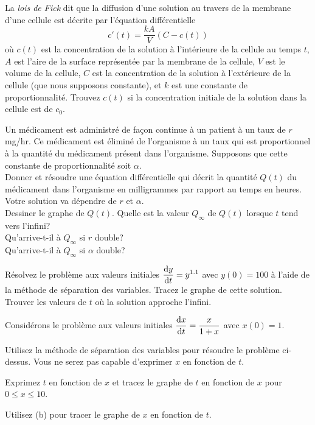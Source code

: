 \begin{question}[\life]
La {\em lois de Fick} dit que la diffusion d'une solution au travers de la
membrane d'une cellule est décrite par l'équation différentielle
\[
c'(t) = \frac{kA}{V} \left( C - c(t) \right)
\]
où $c(t)$ est la concentration de la solution à l'intérieure de la cellule au
temps $t$, $A$ est l'aire de la surface représentée par la membrane de la
cellule, $V$ est le volume de la cellule, $C$ est la concentration de la
solution à l'extérieure de la cellule (que nous supposons constante), et $k$
est une constante de proportionnalité.  Trouvez $c(t)$ si la concentration
initiale de la solution dans la cellule est de $c_0$.
\label{10Q28}
\end{question}

\begin{question}[\life]
Un médicament est administré de façon continue à un patient à un
taux de $r$ mg/hr.  Ce médicament est éliminé de l'organisme à un
taux qui est proportionnel à la quantité du médicament présent dans
l'organisme.  Supposons que cette constante de proportionnalité soit 
$\alpha$. \\
 Donner et résoudre une équation différentielle qui décrit
la quantité $Q(t)$ du médicament dans l'organisme en milligrammes par
rapport au temps en heures.  Votre solution va dépendre de $r$ et 
$\alpha$.\\
 Dessiner le graphe de $Q(t)$.  Quelle est la valeur
$Q_\infty$ de $Q(t)$ lorsque $t$ tend vers l'infini?\\
 Qu'arrive-t-il à $Q_\infty$ si $r$ double?\\
 Qu'arrive-t-il à $Q_\infty$ si $\alpha$ double?
\label{10Q29}
\end{question}

\begin{question}
Résolvez le problème aux valeurs initiales
$\displaystyle \frac{\mathrm{d}y}{\mathrm{d}t} = y^{1.1}$ avec $y(0)=100$ à l'aide de la méthode
de séparation des variables.  Tracez le graphe de cette solution.  Trouver
les valeurs de $t$ où la solution approche l'infini.
\label{10Q30}
\end{question}

\begin{question}
Considérons le problème aux valeurs initiales
$\displaystyle \frac{\mathrm{d}x}{\mathrm{d}t} = \frac{x}{1+x}$ avec $x(0)=1$.

 Utilisez la méthode de séparation des variables pour résoudre le
problème ci-dessus.  Vous ne serez pas capable d'exprimer $x$ en fonction de
$t$.

 Exprimez $t$ en fonction de $x$ et tracez le graphe de $t$ en
fonction de $x$ pour $0\leq x \leq 10$.

 Utilisez (b) pour tracer le graphe de $x$ en fonction de
$t$.
\label{10Q31}
\end{question}

